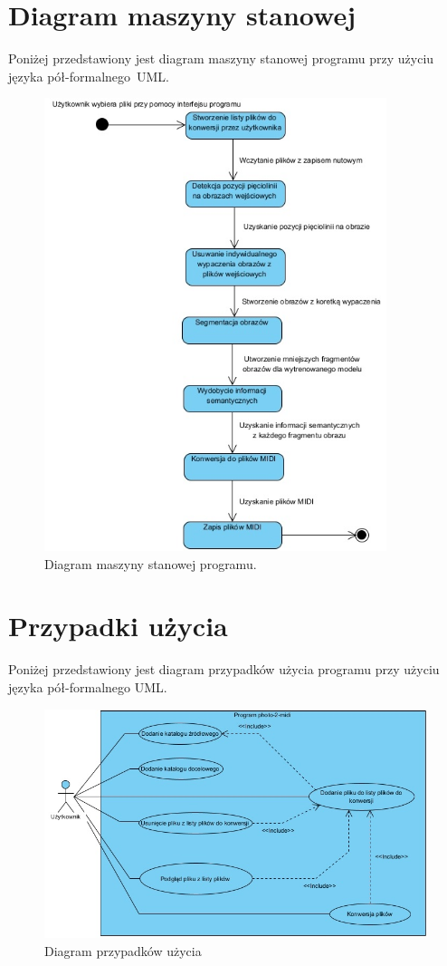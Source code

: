 \section{Diagram maszyny stanowej}
Poniżej przedstawiony jest diagram maszyny stanowej programu przy użyciu języka \linebreak pół-formalnego~UML.
\begin{figure}
	\centering
	\includegraphics[width=10cm]{images/Diagram-maszyny-stanowej-programu.jpg}
	\caption{Diagram maszyny stanowej programu.}
	\label{fig:program-state-machine}
\end{figure}


\section{Przypadki użycia}
Poniżej przedstawiony jest diagram przypadków użycia programu przy użyciu języka \linebreak pół-formalnego UML.

\begin{figure}[htb]
	\centering
	\includegraphics[width=14cm]{images/p2m-usecase-diagram}
	\caption{Diagram przypadków użycia}
	\label{fig:usecase-diagram}
\end{figure}

